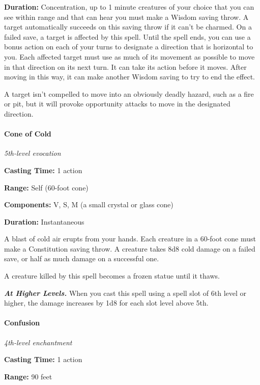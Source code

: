 \documentclass[
]{article}
\begin{document}
\textbf{Duration:} Concentration, up to 1 minute creatures of your
choice that you can see within range and that can hear you must make a
Wisdom saving throw. A target automatically succeeds on this saving
throw if it can't be charmed. On a failed save, a target is affected by
this spell. Until the spell ends, you can use a bonus action on each of
your turns to designate a direction that is horizontal to you. Each
affected target must use as much of its movement as possible to move in
that direction on its next turn. It can take its action before it moves.
After moving in this way, it can make another Wisdom saving to try to
end the effect.

A target isn't compelled to move into an obviously deadly hazard, such
as a fire or pit, but it will provoke opportunity attacks to move in the
designated direction.

\hypertarget{cone-of-cold}{%
\paragraph{Cone of Cold}\label{cone-of-cold}}

\emph{5th-level evocation}

\textbf{Casting Time:} 1 action

\textbf{Range:} Self (60-foot cone)

\textbf{Components:} V, S, M (a small crystal or glass cone)

\textbf{Duration:} Instantaneous

A blast of cold air erupts from your hands. Each creature in a 60-foot
cone must make a Constitution saving throw. A creature takes 8d8 cold
damage on a failed save, or half as much damage on a successful one.

A creature killed by this spell becomes a frozen statue until it thaws.

\emph{\textbf{At Higher Levels.}} When you cast this spell using a spell
slot of 6th level or higher, the damage increases by 1d8 for each slot
level above 5th.

\hypertarget{confusion}{%
\paragraph{Confusion}\label{confusion}}

\emph{4th-level enchantment}

\textbf{Casting Time:} 1 action

\textbf{Range:} 90 feet
\end{document}
